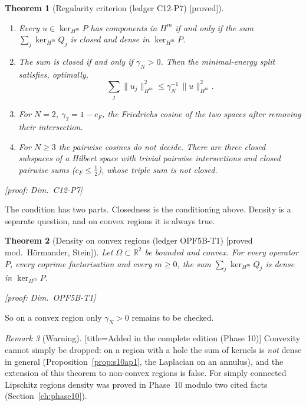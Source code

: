 \documentclass[11pt]{article}
\theoremstyle{plain}
\newtheorem{theorem}{Theorem}[section]
\theoremstyle{definition}
\theoremstyle{remark}
\newtheorem{remark}[theorem]{Remark}
\newcommand{\R}{\mathbb{R}}
\newcommand{\badge}[2]{\textcolor{#1}{\textsf{\footnotesize[#2]}}}
\newcommand{\proved}[1][]{\badge{cC}{proved#1}}
\newcommand{\modulo}[1]{\badge{cD}{proved mod.\ #1}}
\newcommand{\led}[1]{\textcolor{cG}{\textsf{\footnotesize(ledger #1)}}}
\newenvironment{caution}{\begin{remark}[Warning]}{\end{remark}}
\newcommand{\dimref}[1]{\textsf{\footnotesize[proof: Dim.~#1]}}
\begin{document}
\begin{theorem}[{Regularity criterion \led{C12-P7} \proved}]\label{f:thm:hm}
\begin{enumerate}[label=(\alph*)]
\item Every $u\in\ker_{H^m}P$ has components in $H^m$ if and only if the sum $\sum_j\ker_{H^m}Q_j$ is \emph{closed} and \emph{dense} in $\ker_{H^m}P$.
\item The sum is closed if and only if $\gamma_N>0$. Then the minimal-energy split satisfies, optimally,
\[
\sum_j\|u_j\|_{H^m}^2\le\gamma_N^{-1}\,\|u\|_{H^m}^2 .
\]
\item For $N=2$, $\gamma_2=1-c_F$, the Friedrichs cosine of the two spaces after removing their intersection.
\item For $N\ge3$ the pairwise cosines do not decide. There are three closed subspaces of a Hilbert space with trivial pairwise intersections and closed pairwise sums ($c_F\le\tfrac12$), whose triple sum is not closed.
\end{enumerate}
\dimref{C12-P7}
\end{theorem}

The condition has two parts. Closedness is the conditioning above. Density is a separate question, and on convex regions it is always true.

\begin{theorem}[{Density on convex regions \led{OPF5B-T1} \modulo{H\"ormander, Stein}}]\label{thm:density}
Let $\Omega\subset\R^2$ be bounded and convex. For every operator $P$, every coprime factorisation and every $m\ge0$, the sum $\sum_j\ker_{H^m}Q_j$ is dense in $\ker_{H^m}P$.

\dimref{OPF5B-T1}
\end{theorem}

So on a convex region only $\gamma_N>0$ remains to be checked.

\begin{caution}[title=Added in the complete edition (Phase 10)]
Convexity cannot simply be dropped: on a region with a hole the sum of kernels is \emph{not} dense in general (Proposition~\ref{prop:s10ap1}, the Laplacian on an annulus), and the extension of this theorem to non-convex regions is false. For simply connected Lipschitz regions density was proved in Phase~10 modulo two cited facts (Section~\ref{ch:phase10}).
\end{caution}
\end{document}

